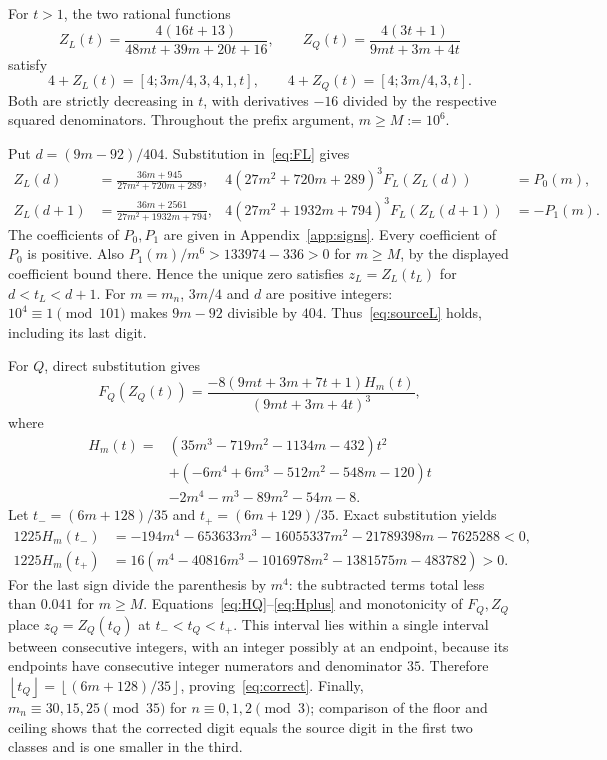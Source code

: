 \documentclass[11pt]{article}
\newcommand{\floor}[1]{\left\lfloor #1\right\rfloor}
\begin{document}
For $t>1$, the two rational functions
\begin{equation}\label{eq:Z}
 Z_L(t)=\frac{4(16t+13)}{48mt+39m+20t+16},\qquad
 Z_Q(t)=\frac{4(3t+1)}{9mt+3m+4t}
\end{equation}
satisfy
\[
 4+Z_L(t)=[4;3m/4,3,4,1,t],\qquad
 4+Z_Q(t)=[4;3m/4,3,t].
\]
Both are strictly decreasing in $t$, with derivatives $-16$ divided by
the respective squared denominators. Throughout the prefix argument,
$m\ge M:=10^6$.

Put $d=(9m-92)/404$. Substitution in~\eqref{eq:FL} gives
\begin{align}
 Z_L(d)&=\frac{36m+945}{27m^2+720m+289},&
 4(27m^2+720m+289)^3F_L(Z_L(d))&=P_0(m),\label{eq:LP0}\\
 Z_L(d+1)&=\frac{36m+2561}{27m^2+1932m+794},&
 4(27m^2+1932m+794)^3F_L(Z_L(d+1))&=-P_1(m).\label{eq:LP1}
\end{align}
The coefficients of $P_0,P_1$ are given in Appendix~\ref{app:signs}.
Every coefficient of $P_0$ is positive. Also
$P_1(m)/m^6>133974-336>0$ for $m\ge M$, by the displayed coefficient
bound there. Hence the unique zero satisfies
$z_L=Z_L(t_L)$ for $d<t_L<d+1$.
For $m=m_n$, $3m/4$ and $d$ are positive integers:
$10^4\equiv1\pmod{101}$ makes $9m-92$ divisible by $404$.
Thus~\eqref{eq:sourceL} holds, including its last digit.

For $Q$, direct substitution gives
\begin{equation}\label{eq:HQ}
 F_Q(Z_Q(t))=\frac{-8(9mt+3m+7t+1)H_m(t)}{(9mt+3m+4t)^3},
\end{equation}
where
\begin{align*}
 H_m(t)={}&(35m^3-719m^2-1134m-432)t^2\\
 &+(-6m^4+6m^3-512m^2-548m-120)t\\
 &-2m^4-m^3-89m^2-54m-8.
\end{align*}
Let $t_-=(6m+128)/35$ and $t_+=(6m+129)/35$. Exact substitution yields
\begin{align}
 1225H_m(t_-)&=-194m^4-653633m^3-16055337m^2
                 -21789398m-7625288<0,\label{eq:Hminus}\\
 1225H_m(t_+)&=16(m^4-40816m^3-1016978m^2
                 -1381575m-483782)>0.\label{eq:Hplus}
\end{align}
For the last sign divide the parenthesis by $m^4$:
the subtracted terms total less than $0.041$ for $m\ge M$.
Equations~\eqref{eq:HQ}--\eqref{eq:Hplus} and monotonicity of $F_Q,Z_Q$
place $z_Q=Z_Q(t_Q)$ at $t_-<t_Q<t_+$.
This interval lies within a single interval between consecutive integers,
with an integer possibly at an endpoint, because its endpoints have
consecutive integer numerators and denominator $35$.
Therefore $\floor{t_Q}=\floor{(6m+128)/35}$, proving~\eqref{eq:correct}.
Finally, $m_n\equiv30,15,25\pmod{35}$ for $n\equiv0,1,2\pmod3$;
comparison of the floor and ceiling shows that the corrected digit equals
the source digit in the first two classes and is one smaller in the third.
\end{document}
